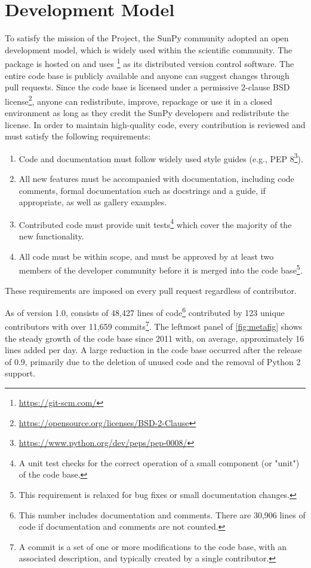 \section{Development Model}
\label{sec:development}

To satisfy the mission of the Project, the SunPy community adopted an open development model, which is widely used within the scientific \python community.
The \sunpypkg package is hosted on \github and uses \footnote{\url{https://git-scm.com/}} as its distributed version control software.
The entire code base is publicly available and anyone can suggest changes through pull requests.
Since the code base is licensed under a permissive 2-clause BSD license\footnote{\url{https://opensource.org/licenses/BSD-2-Clause}}, anyone can redistribute, improve, repackage or use it in a closed environment as long as they credit the SunPy developers and redistribute the license.
In order to maintain high-quality code, every contribution is reviewed and must satisfy the following requirements:
\begin{enumerate}
    \item Code and documentation must follow widely used style guides (e.g., PEP 8\footnote{\url{https://www.python.org/dev/peps/pep-0008/}}).
    \item All new features must be accompanied with documentation, including code comments, formal documentation such as \python docstrings and a guide, if appropriate, as well as gallery examples.
    \item Contributed code must provide unit tests\footnote{A unit test checks for the correct operation of a small component (or "unit") of the code base.} which cover the majority of the new functionality.
    \item All code must be within scope, and must be approved by at least two members of the developer community before it is merged into the code base\footnote{This requirement is relaxed for bug fixes or small documentation changes.}.
\end{enumerate}
These requirements are imposed on every pull request regardless of contributor.

As of version 1.0, \sunpypkg consists of 48,427 lines of code\footnote{This number includes documentation and comments.
There are 30,906 lines of code if documentation and comments are not counted.} contributed by 123 unique contributors with over 11,659 commits\footnote{A commit is a set of one or more modifications to the code base, with an associated description, and typically created by a single contributor.}.
The leftmost panel of \autoref{fig:metafig} shows the steady growth of the code base since 2011 with, on average, approximately 16 lines added per day.
A large reduction in the code base occurred after the release of 0.9, primarily due to the deletion of unused code and the removal of Python 2 support.

